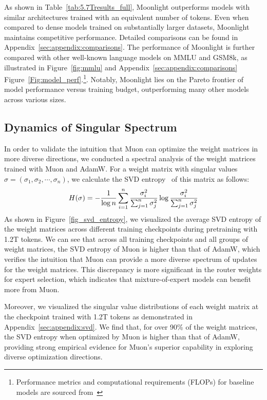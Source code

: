 As shown in Table~\ref{tab:5.7Tresults_full}, Moonlight outperforms models with similar architectures trained with an equivalent number of tokens. Even when compared to dense models trained on substantially larger datasets, Moonlight maintains competitive performance. Detailed comparisons can be found in Appendix~\ref{sec:appendix:comparisons}. The performance of Moonlight is further compared with other well-known language models on MMLU and GSM8k, as illustrated in Figure~\ref{fig:mmlu} and Appendix~\ref{sec:appendix:comparisons} Figure~\ref{Fig:model_perf}.\footnote{Performance metrics and computational requirements (FLOPs) for baseline models are sourced from~\citep{olmo20242}}. Notably, Moonlight lies on the Pareto frontier of model performance versus training budget, outperforming many other models across various sizes. 




\subsection{Dynamics of Singular Spectrum}
In order to validate the intuition that Muon can optimize the weight matrices in more diverse directions, we conducted a spectral analysis of the weight matrices trained with Muon and AdamW. For a weight matrix with singular values $\sigma = (\sigma_1, \sigma_2, \cdots, \sigma_n)$, we calculate the SVD entropy~\citep{svd_entropy, effectiverank} of this matrix as follows:
\begin{equation}
    H(\sigma) = -\frac{1}{\log n}\sum_{i=1}^n \frac{\sigma^2_i}{\sum_{j=1}^n \sigma^2_j} \log \frac{\sigma^2_i}{\sum_{j=1}^n \sigma^2_j} \notag
\end{equation}
As shown in Figure~\ref{fig_svd_entropy}, we visualized the average SVD entropy of the weight matrices across different training checkpoints during pretraining with 1.2T tokens. We can see that across all training checkpoints and all groups of weight matrices, the SVD entropy of Muon is higher than that of AdamW, which verifies the intuition that Muon can provide a more diverse spectrum of updates for the weight matrices. This discrepancy is more significant in the router weights for expert selection, which indicates that mixture-of-expert models can benefit more from Muon.

Moreover, we visualized the singular value distributions of each weight matrix at the checkpoint trained with 1.2T tokens as demonstrated in Appendix~\ref{sec:appendix:svd}. We find that, for over 90\% of the weight matrices, the SVD entropy when optimized by Muon is higher than that of AdamW, providing strong empirical evidence for Muon's superior capability in exploring diverse optimization directions.


